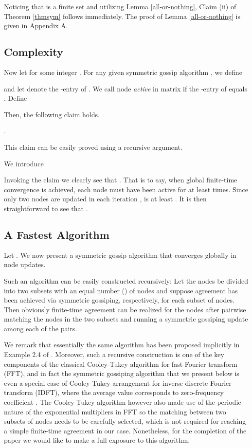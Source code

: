 \documentclass[a4paper, 11pt]{article}
\begin{document}
Noticing that  is a finite set and utilizing  Lemma \ref{all-or-nothing}, Claim (ii) of Theorem \ref{thmsym} follows immediately. The proof of Lemma \ref{all-or-nothing} is given in Appendix A.









\subsection{Complexity}
Now let  for some integer . For any given symmetric  gossip algorithm , we define

and let  denote the -entry of . We call node  {\em active} in matrix  if the -entry of  equals . Define

Then, the following claim holds.

\vspace{2mm}

   .

\vspace{2mm}

This claim can be easily proved using a recursive argument.

We introduce

Invoking the claim we clearly see that . That is to say, when global finite-time convergence is achieved,  each node must have been active for at least  times. Since only two nodes are updated in each iteration ,   is at least . It is then straightforward to see that .


\subsection{A Fastest Algorithm} Let . We now present  a symmetric gossip algorithm that converges globally in  node updates.
{ Such an algorithm can be easily constructed recursively: Let the  nodes be  divided   into  two subsets with an equal number () of nodes and suppose agreement has been achieved via symmetric gossiping, respectively, for each subset of nodes. Then obviously finite-time agreement can be realized  for the  nodes after  pairwise matching the nodes in the two subsets and running  a symmetric gossiping update among each of the pairs.


We remark that  essentially the same algorithm has  been proposed implicitly in Example 2.4 of \cite{FagnaniJSAC}. Moreover, such a  recursive construction is one of  the key components of
the classical  Cooley-Tukey  algorithm \cite{butterfly} for fast Fourier transform (FFT), and in fact the symmetric gossiping  algorithm that we present below  is even a special case of Cooley-Tukey arrangement for inverse discrete Fourier transform (IDFT), where the average value corresponds to  zero-frequency coefficient \cite{IDFT}. The  Cooley-Tukey  algorithm however also made use of the periodic nature of the exponential multipliers in FFT so the matching between two subsets of  nodes needs to be carefully selected, which is not required  for reaching a simple finite-time agreement in our case. Nonetheless, for the completion of the paper we would like to make a full exposure to this algorithm.
}
\end{document}
